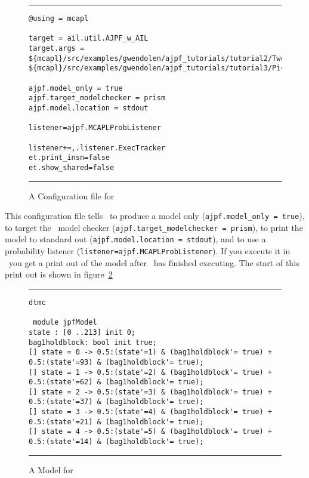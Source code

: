 \documentclass[a4]{article}
\begin{document}
\begin{figure}[htb]
\noindent\rule{\textwidth}{1pt}
\begin{small}
\begin{verbatim}
@using = mcapl

target = ail.util.AJPF_w_AIL
target.args = ${mcapl}/src/examples/gwendolen/ajpf_tutorials/tutorial2/TwoPickUpAgents.ail,
${mcapl}/src/examples/gwendolen/ajpf_tutorials/tutorial3/PickUpAgent.psl,1

ajpf.model_only = true
ajpf.target_modelchecker = prism
ajpf.model.location = stdout

listener=ajpf.MCAPLProbListener

listener+=,.listener.ExecTracker
et.print_insn=false
et.show_shared=false
\end{verbatim}
\end{small}
\rule{\textwidth}{1pt}
\caption{A Configuration file for \prism}
\label{fig:prism_config1}
\end{figure}

This configuration file tells \ajpf\ to produce a model only (\texttt{ajpf.model\_only = true}), to target the \prism\ model checker (\texttt{ajpf.target\_modelchecker = prism}), to print the model to standard out (\texttt{ajpf.model.location = stdout}), and to use a probability listener (\texttt{listener=ajpf.MCAPLProbListener}).  If you execute it in \ajpf\ you get a print out of the model after \ajpf\  has finished executing.  The start of this print out is shown in figure~\ref{fig:prism_output1}

\begin{figure}[htb]
\noindent\rule{\textwidth}{1pt}
\begin{small}
\begin{verbatim}
dtmc

 module jpfModel
state : [0 ..213] init 0;
bag1holdblock: bool init true;
[] state = 0 -> 0.5:(state'=1) & (bag1holdblock'= true) + 0.5:(state'=93) & (bag1holdblock'= true);
[] state = 1 -> 0.5:(state'=2) & (bag1holdblock'= true) + 0.5:(state'=62) & (bag1holdblock'= true);
[] state = 2 -> 0.5:(state'=3) & (bag1holdblock'= true) + 0.5:(state'=37) & (bag1holdblock'= true);
[] state = 3 -> 0.5:(state'=4) & (bag1holdblock'= true) + 0.5:(state'=21) & (bag1holdblock'= true);
[] state = 4 -> 0.5:(state'=5) & (bag1holdblock'= true) + 0.5:(state'=14) & (bag1holdblock'= true);
\end{verbatim}
\end{small}
\rule{\textwidth}{1pt}
\caption{A Model for \prism}
\label{fig:prism_output1}
\end{figure}
\end{document}
